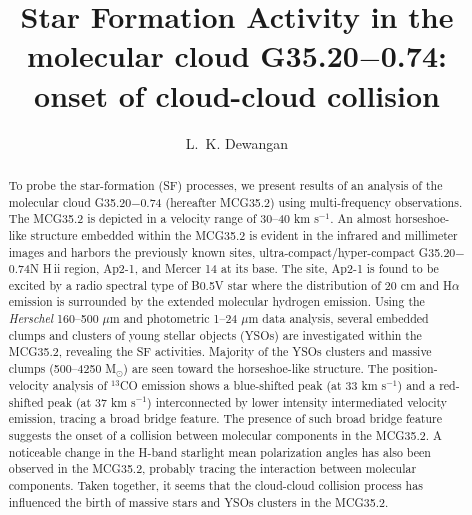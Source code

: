 \documentclass[iop]{emulateapj}
\begin{document}
\title{Star Formation Activity in the molecular cloud G35.20$-$0.74: onset of cloud-cloud collision}
\author{L.~K. Dewangan}
%
\begin{abstract}
%
To probe the star-formation (SF) processes, we present results of an analysis of the molecular cloud G35.20$-$0.74 (hereafter MCG35.2) 
using multi-frequency observations. 
The MCG35.2 is depicted in a velocity range of 30--40 km s$^{-1}$. An almost horseshoe-like structure embedded within the MCG35.2 is evident 
in the infrared and millimeter images and harbors the previously known sites, ultra-compact/hyper-compact G35.20$-$0.74N H\,{\sc ii} region, Ap2-1, and Mercer 14 at its base. 
The site, Ap2-1 is found to be excited by a radio spectral type of B0.5V star where the distribution of 20 cm and H$\alpha$ emission is surrounded by the extended molecular hydrogen emission. 
Using the {\it Herschel} 160--500 $\mu$m and photometric 1--24 $\mu$m data analysis, several embedded clumps and clusters of young stellar objects (YSOs) are investigated 
within the MCG35.2, revealing the SF activities. 
Majority of the YSOs clusters and massive clumps (500--4250 M$_{\odot}$) are seen toward the horseshoe-like structure. 
The position-velocity analysis of $^{13}$CO emission shows a blue-shifted peak (at 33 km s$^{-1}$) and a red-shifted 
peak (at 37 km s$^{-1}$) interconnected by lower intensity intermediated velocity emission, tracing a broad bridge feature. 
The presence of such broad bridge feature suggests the onset of a collision between molecular components in the MCG35.2.  
A noticeable change in the H-band starlight mean polarization angles has also been observed in the MCG35.2, probably tracing the interaction between molecular components. Taken together, it seems that the cloud-cloud collision process has influenced the birth of massive stars and YSOs clusters in the MCG35.2.
 \end{abstract}
%
\end{document}
